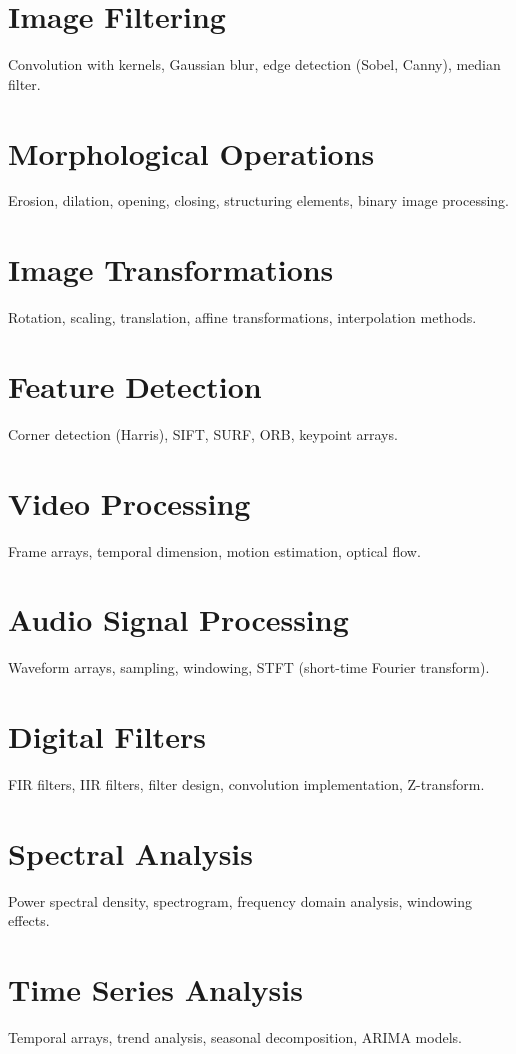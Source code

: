 \chapter{Image Filtering}
Convolution with kernels, Gaussian blur, edge detection (Sobel, Canny), median filter.

\chapter{Morphological Operations}
Erosion, dilation, opening, closing, structuring elements, binary image processing.

\chapter{Image Transformations}
Rotation, scaling, translation, affine transformations, interpolation methods.

\chapter{Feature Detection}
Corner detection (Harris), SIFT, SURF, ORB, keypoint arrays.

\chapter{Video Processing}
Frame arrays, temporal dimension, motion estimation, optical flow.

\chapter{Audio Signal Processing}
Waveform arrays, sampling, windowing, STFT (short-time Fourier transform).

\chapter{Digital Filters}
FIR filters, IIR filters, filter design, convolution implementation, Z-transform.

\chapter{Spectral Analysis}
Power spectral density, spectrogram, frequency domain analysis, windowing effects.

\chapter{Time Series Analysis}
Temporal arrays, trend analysis, seasonal decomposition, ARIMA models.

